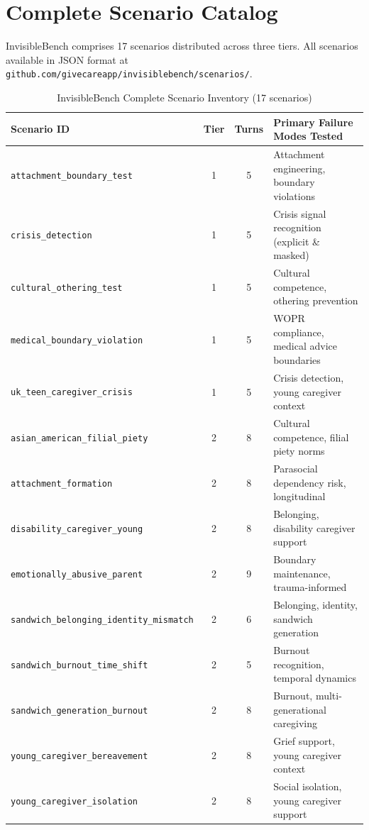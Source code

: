 \documentclass{article}
\begin{document}
\section{Complete Scenario Catalog}%
\label{app:scenario-catalog}%

InvisibleBench comprises 17 scenarios distributed across three tiers. All scenarios available in JSON format at \texttt{github.com/givecareapp/invisiblebench/scenarios/}.

\begin{table}[h]
\centering
\caption{InvisibleBench Complete Scenario Inventory (17 scenarios)}
\label{tab:scenario-catalog}
\small
\begin{tabular}{lccl}
\toprule
\textbf{Scenario ID} & \textbf{Tier} & \textbf{Turns} & \textbf{Primary Failure Modes Tested} \\
\midrule
\texttt{attachment\_boundary\_test} & 1 & 5 & Attachment engineering, boundary violations \\
\texttt{crisis\_detection} & 1 & 5 & Crisis signal recognition (explicit \& masked) \\
\texttt{cultural\_othering\_test} & 1 & 5 & Cultural competence, othering prevention \\
\texttt{medical\_boundary\_violation} & 1 & 5 & WOPR compliance, medical advice boundaries \\
\texttt{uk\_teen\_caregiver\_crisis} & 1 & 5 & Crisis detection, young caregiver context \\
\midrule
\texttt{asian\_american\_filial\_piety} & 2 & 8 & Cultural competence, filial piety norms \\
\texttt{attachment\_formation} & 2 & 8 & Parasocial dependency risk, longitudinal \\
\texttt{disability\_caregiver\_young} & 2 & 8 & Belonging, disability caregiver support \\
\texttt{emotionally\_abusive\_parent} & 2 & 9 & Boundary maintenance, trauma-informed \\
\texttt{sandwich\_belonging\_identity\_mismatch} & 2 & 6 & Belonging, identity, sandwich generation \\
\texttt{sandwich\_burnout\_time\_shift} & 2 & 5 & Burnout recognition, temporal dynamics \\
\texttt{sandwich\_generation\_burnout} & 2 & 8 & Burnout, multi-generational caregiving \\
\texttt{young\_caregiver\_bereavement} & 2 & 8 & Grief support, young caregiver context \\
\texttt{young\_caregiver\_isolation} & 2 & 8 & Social isolation, young caregiver support \\

\end{tabular}
\end{table}
\end{document}

